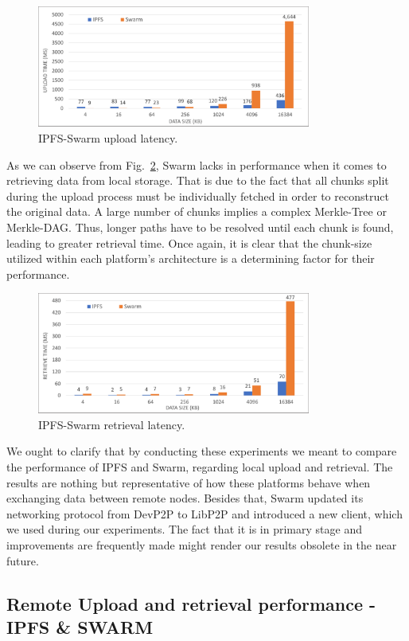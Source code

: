 \begin{figure}[htbp]
\centerline{\includegraphics[width=9cm]{figs/ipfs_swarm_upload.pdf}}
\caption{IPFS-Swarm upload latency.}
\label{fig: ipfs_swarm_upload}
\end{figure}
\setlength{\belowcaptionskip}{-10pt}

As we can observe from Fig.~\ref{fig: ipfs_swarm_retrieve}, Swarm lacks in performance when it comes to retrieving data from local storage. That is due to the fact that all chunks split during the upload process must be individually fetched in order to reconstruct the original data. A large number of chunks implies a complex Merkle-Tree or Merkle-DAG. Thus, longer paths have to be resolved until each chunk is found, leading to greater retrieval time. Once again, it is clear that the chunk-size utilized within each platform’s architecture is a determining factor for their performance.

\begin{figure}[htbp]
\centerline{\includegraphics[width=9cm]{figs/ipfs_swarm_retrieve.pdf}}
\caption{IPFS-Swarm retrieval latency.}
\label{fig: ipfs_swarm_retrieve}
\end{figure}
\setlength{\belowcaptionskip}{-10pt}

We ought to clarify that by conducting these experiments we meant to compare the performance of IPFS and Swarm, regarding local upload and retrieval. The results are nothing but representative of how these platforms behave when exchanging data between remote nodes. Besides that, Swarm updated its networking protocol from DevP2P to LibP2P and introduced a new client, which we used during our experiments. The fact that it is in primary stage and improvements are frequently made might render our results obsolete in the near future.
\subsection{Remote Upload and retrieval performance - IPFS \& SWARM}\label{subsection:}



